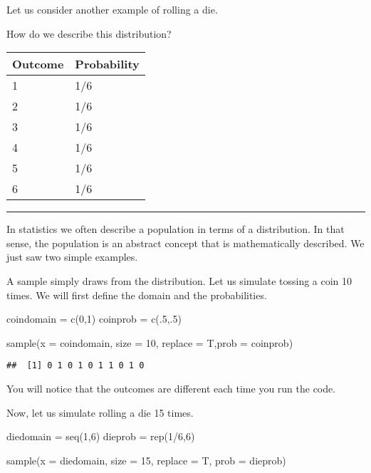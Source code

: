 \documentclass[
]{article}
\newenvironment{Shaded}{\begin{snugshade}}{\end{snugshade}}
\newcommand{\AttributeTok}[1]{\textcolor[rgb]{0.77,0.63,0.00}{#1}}
\newcommand{\DecValTok}[1]{\textcolor[rgb]{0.00,0.00,0.81}{#1}}
\newcommand{\FunctionTok}[1]{\textcolor[rgb]{0.00,0.00,0.00}{#1}}
\newcommand{\NormalTok}[1]{#1}
\newcommand{\OtherTok}[1]{\textcolor[rgb]{0.56,0.35,0.01}{#1}}
\newcommand{\SpecialCharTok}[1]{\textcolor[rgb]{0.00,0.00,0.00}{#1}}
\begin{document}
Let us consider another example of rolling a die.

How do we describe this distribution?

\begin{longtable}[]{@{}ll@{}}
\toprule()
Outcome & Probability \\
\midrule()
\endhead
1 & 1/6 \\
2 & 1/6 \\
3 & 1/6 \\
4 & 1/6 \\
5 & 1/6 \\
6 & 1/6 \\
\bottomrule()
\end{longtable}

\begin{center}\rule{0.5\linewidth}{0.5pt}\end{center}

In statistics we often describe a population in terms of a distribution.
In that sense, the population is an abstract concept that is
mathematically described. We just saw two simple examples.

A sample simply draws from the distribution. Let us simulate tossing a
coin 10 times. We will first define the domain and the probabilities.

\begin{Shaded}
\begin{Highlighting}[]
\NormalTok{coindomain }\OtherTok{=} \FunctionTok{c}\NormalTok{(}\DecValTok{0}\NormalTok{,}\DecValTok{1}\NormalTok{)}
\NormalTok{coinprob }\OtherTok{=} \FunctionTok{c}\NormalTok{(.}\DecValTok{5}\NormalTok{,.}\DecValTok{5}\NormalTok{)}

\FunctionTok{sample}\NormalTok{(}\AttributeTok{x =}\NormalTok{ coindomain, }\AttributeTok{size =} \DecValTok{10}\NormalTok{, }\AttributeTok{replace =}\NormalTok{ T,}\AttributeTok{prob =}\NormalTok{ coinprob)}
\end{Highlighting}
\end{Shaded}

\begin{verbatim}
##  [1] 0 1 0 1 0 1 1 0 1 0
\end{verbatim}

You will notice that the outcomes are different each time you run the
code.

Now, let us simulate rolling a die 15 times.

\begin{Shaded}
\begin{Highlighting}[]
\NormalTok{diedomain }\OtherTok{=} \FunctionTok{seq}\NormalTok{(}\DecValTok{1}\NormalTok{,}\DecValTok{6}\NormalTok{)}
\NormalTok{dieprob }\OtherTok{=} \FunctionTok{rep}\NormalTok{(}\DecValTok{1}\SpecialCharTok{/}\DecValTok{6}\NormalTok{,}\DecValTok{6}\NormalTok{)}

\FunctionTok{sample}\NormalTok{(}\AttributeTok{x =}\NormalTok{ diedomain, }\AttributeTok{size =} \DecValTok{15}\NormalTok{, }\AttributeTok{replace =}\NormalTok{ T, }\AttributeTok{prob =}\NormalTok{ dieprob)}
\end{Highlighting}
\end{Shaded}
\end{document}
